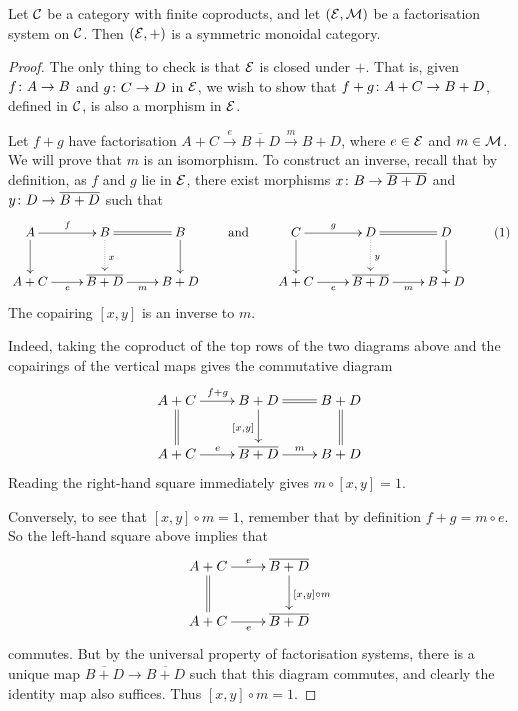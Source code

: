 \begin{lemma} \label{lem.monfact}
  Let $\mathcal C$ be a category with finite coproducts, and let $(\mathcal E, \mathcal M)$ be a
  factorisation system on $\mathcal C$. Then $(\mathcal E,+)$ is a symmetric monoidal
  category.
\end{lemma}
\begin{proof}
  The only thing to check is that $\mathcal E$ is closed under $+$. That is, given
  $f{\colon} A \to B$ and $g{\colon} C \to D$ in $\mathcal E$, we wish to show that
  $f+g{\colon} A+C \to B+D$, defined in $\mathcal C$, is also a morphism in $\mathcal E$. 

  Let $f+g$ have factorisation $A+C \stackrel{e}\longrightarrow \overline{B+D}
  \stackrel{m}\longrightarrow B+D$, where $e \in \mathcal E$ and $m \in \mathcal
  M$. We will prove that $m$ is an isomorphism. To construct an inverse, recall
  that by definition, as $f$ and $g$ lie in $\mathcal E$, there exist morphisms
  $x{\colon} B \to \overline{B+D}$ and $y{\colon} D \to \overline{B+D}$ such that
  \[ \label{eq.coreltensor}
    \xymatrixcolsep{2pc}
    \xymatrixrowsep{2pc}
    \xymatrix{
      A \ar[r]^f \ar[d] & B \ar@{=}[r] \ar@{.>}[d]^x & B
      \ar[d] \\
      A+C \ar[r]_{e}&\overline{B+D} \ar[r]_{m} & B+D
    }
    \qquad \mbox{and} \qquad
    \xymatrixcolsep{2pc}
    \xymatrixrowsep{2pc}
    \xymatrix{
      C \ar[r]^g \ar[d] & D \ar@{=}[r] \ar@{.>}[d]^y & D
      \ar[d] \\
      A+C \ar[r]_{e}&\overline{B+D} \ar[r]_{m} & B+D
    }
    \tag{1}
  \]
  The copairing $[x,y]$ is an inverse to $m$. 
  
  Indeed, taking the coproduct of the top rows of the two diagrams above and the
  copairings of the vertical maps gives the commutative diagram
  \[
    \xymatrix{
      A+C \ar[r]^{f+g} \ar@{=}[d] & B+D \ar@{=}[r] \ar[d]_{[x,y]} & B+D \ar@{=}[d] \\
      A+C \ar[r]^{e} & \overline{B+D} \ar[r]^{m} & B+D
    }
  \]
  Reading the right-hand square immediately gives $m \circ [x,y] =1$.
  
  Conversely, to see that $[x,y] \circ m = 1$, remember that by definition $f+g
  = m \circ e$. So the left-hand square above implies that
  \[
    \xymatrixcolsep{2pc}
    \xymatrixrowsep{2pc}
    \xymatrix{
      A+C \ar[r]^e \ar@{=}[d] & \overline{B+D} \ar[d]^{[x,y] \circ m} \\
      A+C \ar[r]_{e}&\overline{B+D} 
    }
  \]
  commutes. But by the universal property of factorisation systems, there is a
  unique map $\overline{B+D} \to \overline{B+D}$ such that this diagram
  commutes, and clearly the identity map also suffices. Thus $[x,y] \circ m =
  1$.
\end{proof}

